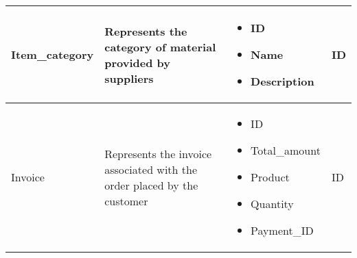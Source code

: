 \begin{longtable}{|p{}|p{} |p{}|p{} |}
    Item\_category & Represents the category of material provided by suppliers &
    \begin{itemize}
        \vspace{-1em}
        \item ID
        \item Name
        \item Description
    \end{itemize}
    &  ID \\\hline

    Invoice & Represents the invoice associated with the order placed by the customer &
        \begin{itemize}
            \vspace{-1em}
            \item ID
            \item Total\_amount
            \item Product   %
            \item Quantity
            \item Payment\_ID
        \end{itemize}
        &  ID \\\hline
\end{longtable}